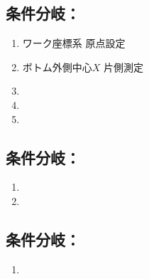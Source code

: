 \subsection{条件分岐：\PMBottomOutcutExists}

\begin{enumerate}[label=\sarrow]
\item ワーク座標系 原点設定
\item ボトム外側中心$X$ 片側測定
\item \BottomOutcutMilling
\item \BottomEndFaceOutChamferMilling
\item \CenterlineEndFaceDifMeasurement
\end{enumerate}


\subsection{条件分岐：\PMSquareEndMillTaperExists}

\begin{enumerate}[label=\sarrow]
\item \OutcutMilling
\item \CurvedOutcutMilling
\end{enumerate}


\subsection{条件分岐：\PMOutcutCenterReference}

\begin{enumerate}[label=\sarrow]
\item \CenterlineEndFaceDifMeasurement
\end{enumerate}



\clearpage


